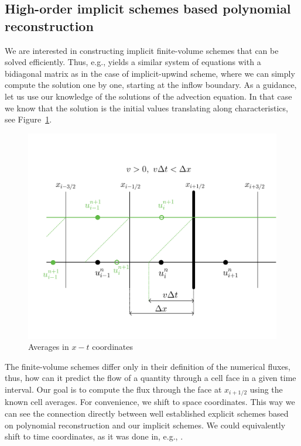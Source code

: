 \documentclass[../thesis.tex]{subfiles}
\begin{document}
\graphicspath{ {./img/} }
\subsection[]{High-order implicit schemes based polynomial reconstruction}
We are interested in constructing implicit finite-volume schemes that can be solved efficiently. Thus, e.g., yields a similar system of equations with a bidiagonal matrix as in the case of implicit-upwind scheme, where we can simply compute the solution one by one, starting at the inflow boundary.
As a guidance, let us use our knowledge of the solutions of the advection equation. In that case we know that the solution is the initial values translating along characteristics, see Figure~\ref{fig:characteristics-1d}.
\begin{figure}[H]
	\centering
	\includegraphics[width=\textwidth]{Characteristics-crop.pdf}
	\caption{Averages in \(x-t\) coordinates}
	\label{fig:characteristics-1d}
\end{figure}
The finite-volume schemes differ only in their definition of the numerical fluxes, thus, how can it predict the flow of a quantity through a cell face in a given time interval.
Our goal is to compute the flux through the face at \(x_{i+1/2}\) using the known cell averages.
For convenience, we shift to space coordinates.
This way we can see the connection directly between well established explicit schemes based on polynomial reconstruction \cite{1977_VanLeer,2002_LeVeque_BOOK} and our implicit schemes.
We could equivalently shift to time coordinates, as it was done in, e.g., \cite{2023_Barsukow,2022_Eimer}.
\end{document}
